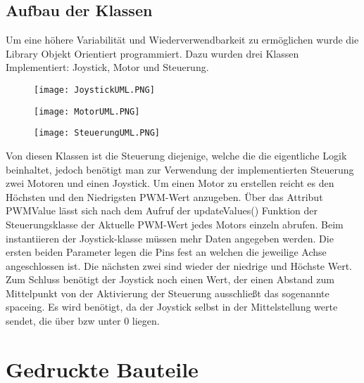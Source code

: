 \documentclass{article}
\begin{document}
\subsection{Aufbau der Klassen}
Um eine höhere Variabilität und Wiederverwendbarkeit zu ermöglichen wurde die Library Objekt Orientiert programmiert. Dazu wurden drei Klassen Implementiert: Joystick, Motor und Steuerung.
\begin{figure}[h]
	\texttt{[image: JoystickUML.PNG]}
	\centering
\end{figure}\begin{figure}[h]
	\texttt{[image: MotorUML.PNG]}
	\centering
\end{figure}\begin{figure}[h]
	\texttt{[image: SteuerungUML.PNG]}
	\centering
\end{figure}
Von diesen Klassen ist die Steuerung diejenige, welche die die eigentliche Logik beinhaltet, jedoch benötigt man zur Verwendung der implementierten Steuerung zwei Motoren und einen Joystick. Um einen Motor zu erstellen reicht es den Höchsten und den Niedrigsten PWM-Wert anzugeben. Über das Attribut PWMValue lässt sich nach dem Aufruf der updateValues() Funktion der Steuerungsklasse der Aktuelle PWM-Wert jedes Motors einzeln abrufen. Beim instantiieren der Joystick-klasse müssen mehr Daten angegeben werden. Die ersten beiden Parameter legen die Pins fest an welchen die jeweilige Achse angeschlossen ist. Die nächsten zwei sind wieder der niedrige und Höchste Wert. Zum Schluss benötigt der Joystick noch einen Wert, der einen Abstand zum Mittelpunkt von der Aktivierung der Steuerung ausschließt das sogenannte spaceing. Es wird benötigt, da der Joystick selbst in der Mittelstellung werte sendet, die über bzw unter 0 liegen.    

\newpage
\section{Gedruckte Bauteile} %
\end{document}
